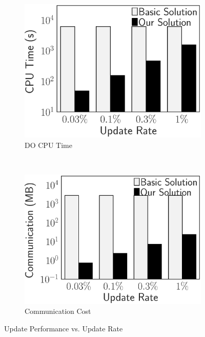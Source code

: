 \begin{figure}[t]
    \centering
    \begin{subfigure}[b]{.5\linewidth}
        \centering
        \includegraphics[height=\ht\figbox]{exp-figs/access-control/update_do_time.eps}
        \caption{DO CPU Time}\label{exp-fig:access-control:update_do_time}
    \end{subfigure}~%
    \begin{subfigure}[b]{.5\linewidth}
        \centering
        \includegraphics[height=\ht\figbox]{exp-figs/access-control/update_do_size.eps}
        \caption{Communication Cost}\label{exp-fig:access-control:update_do_size}
    \end{subfigure}
    \caption{Update Performance vs. Update Rate}\label{exp-fig:access-control:update_do}
\end{figure}
